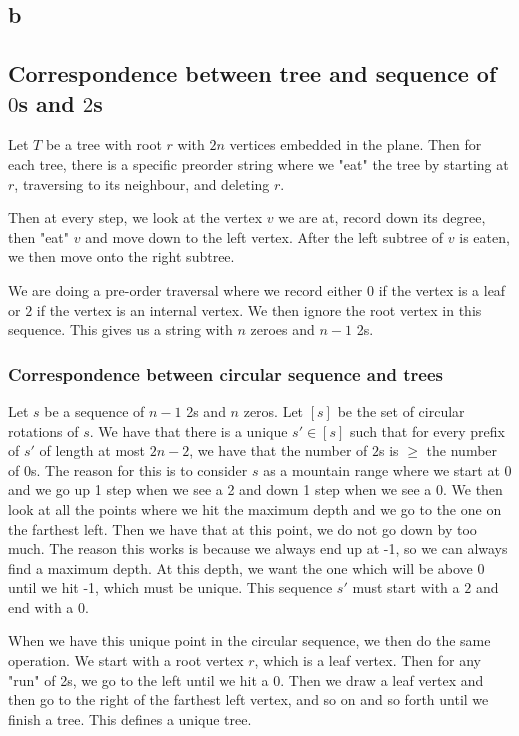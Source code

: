 \documentclass[]{article}
\theoremstyle{definition}
\numberwithin{theorem}{section}
\numberwithin{equation}{section}
\begin{document}
\subsection{b}
\subsection{Correspondence between tree and sequence of $0$s and $2$s}
Let $T$ be a tree with root $r$ with $2n$ vertices embedded in the plane. Then for each tree, there is a specific preorder string where we "eat" the tree by starting at $r$, traversing to its neighbour, and deleting $r$.

Then at every step, we look at the vertex $v$ we are at, record down its degree, then "eat" $v$ and move down to the left vertex. After the left subtree of $v$ is eaten, we then move onto the right subtree.

We are doing a pre-order traversal where we record either $0$ if the vertex is a leaf or $2$ if the vertex is an internal vertex. We then ignore the root vertex in this sequence. This gives us a string with $n$ zeroes and $n-1$ 2s. 

\subsubsection{Correspondence between circular sequence and trees}
Let $s$ be a sequence of $n - 1$ 2s and $n$ zeros. Let $[s]$ be the set of circular rotations of $s$. We have that there is a unique $s' \in [s]$ such that for every prefix of $s'$ of length at most $2n - 2$, we have that the number of $2$s is $\geq$ the number of $0$s. The reason for this is to consider $s$ as a mountain range where we start at $0$ and we go up 1 step when we see a 2 and down 1 step when we see a 0. We then look at all the points where we hit the maximum depth and we go to the one on the farthest left. Then we have that at this point, we do not go down by too much. The reason this works is because we always end up at -1, so we can always find a maximum depth. At this depth, we want the one which will be above 0 until we hit -1, which must be unique. This sequence $s'$ must start with a $2$ and end with a $0$. 

When we have this unique point in the circular sequence, we then do the same operation. We start with a root vertex $r$, which is a leaf vertex. Then for any "run" of 2s, we go to the left until we hit a 0. Then we draw a leaf vertex and then go to the right of the farthest left vertex, and so on and so forth until we finish a tree. This defines a unique tree.
\end{document}
